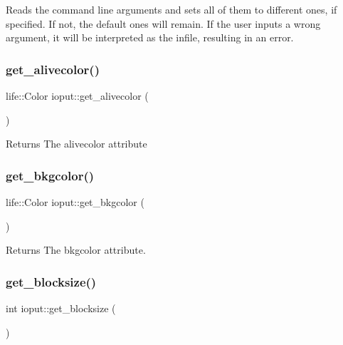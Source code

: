 Reads the command line arguments and sets all of them to different ones, if specified. If not, the default ones will remain. If the user inputs a wrong argument, it will be interpreted as the infile, resulting in an error. \mbox{\label{classioput_a11c07552398d47f872787e3f0a7aee40}} 
\subsubsection{\texorpdfstring{get\+\_\+alivecolor()}{get\_alivecolor()}}
{\footnotesize\ttfamily life\+::\+Color ioput\+::get\+\_\+alivecolor (\begin{DoxyParamCaption}{ }\end{DoxyParamCaption})\hspace{0.3cm}{\ttfamily [inline]}}

\begin{DoxyReturn}{Returns}
The alivecolor attribute 
\end{DoxyReturn}
\mbox{\label{classioput_a5c708adf775782056bac78f5a8596ace}} 
\subsubsection{\texorpdfstring{get\+\_\+bkgcolor()}{get\_bkgcolor()}}
{\footnotesize\ttfamily life\+::\+Color ioput\+::get\+\_\+bkgcolor (\begin{DoxyParamCaption}{ }\end{DoxyParamCaption})\hspace{0.3cm}{\ttfamily [inline]}}

\begin{DoxyReturn}{Returns}
The bkgcolor attribute. 
\end{DoxyReturn}
\mbox{\label{classioput_aae6979078f699f9b769297664ee26396}} 
\subsubsection{\texorpdfstring{get\+\_\+blocksize()}{get\_blocksize()}}
{\footnotesize\ttfamily int ioput\+::get\+\_\+blocksize (\begin{DoxyParamCaption}{ }\end{DoxyParamCaption})\hspace{0.3cm}{\ttfamily [inline]}}

